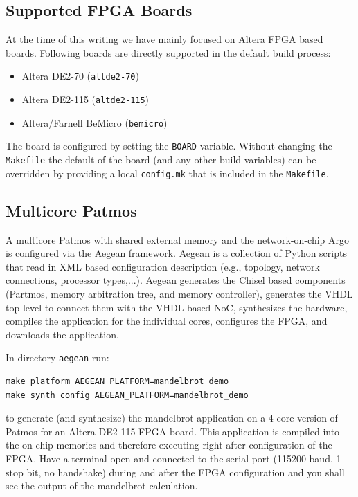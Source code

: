 \documentclass[a4paper,fontsize=10pt,twoside,DIV15,BCOR12mm,headinclude=true,footinclude=false,pagesize,bibtotoc]{scrbook}
\newcommand{\code}[1]{{\texttt{#1}}}
\newcommand{\comment}[3]{

\textsf{\textbf{#1}} {\color{#3}#2}}
\newcommand{\martin}[1]{\comment{Martin}{#1}{Blue}}
\renewcommand{\martin}[1]{}
\begin{document}
\martin{Where is the make target to run the emulator with an ELF file?}

\subsection{Supported FPGA Boards}

At the time of this writing we have mainly focused on Altera FPGA based boards. Following boards
are directly supported in the default build process:

\begin{itemize}
\item Altera DE2-70 (\code{altde2-70})
\item Altera DE2-115 (\code{altde2-115})
\item Altera/Farnell BeMicro (\code{bemicro})
\end{itemize}

The board is configured by setting the \code{BOARD} variable.
Without changing the \code{Makefile} the default of the board (and any other build variables)
can be overridden by providing a local \code{config.mk} that is included in the \code{Makefile}.

\subsection{Multicore Patmos}

A multicore Patmos with shared external memory and the network-on-chip Argo is configured via
the Aegean framework. Aegean is a collection of Python scripts that read in XML based configuration
description (e.g., topology, network connections, processor types,...). Aegean generates the Chisel based
components (Partmos, memory arbitration tree, and memory controller), generates the VHDL top-level
to connect them with the VHDL based NoC, synthesizes the hardware, compiles the application for the
individual cores, configures the FPGA, and downloads the application.

In directory \code{aegean} run:

\begin{verbatim}
make platform AEGEAN_PLATFORM=mandelbrot_demo
make synth config AEGEAN_PLATFORM=mandelbrot_demo
\end{verbatim}

to generate (and synthesize) the mandelbrot application on a 4 core
version of Patmos for an Altera DE2-115 FPGA board. This application is compiled
into the on-chip memories and therefore executing right after configuration of the
FPGA. Have a terminal open and connected to the serial port (115200 baud, 1 stop bit,
no handshake) during and after the FPGA configuration and you shall see the output of
the mandelbrot calculation.
\end{document}
